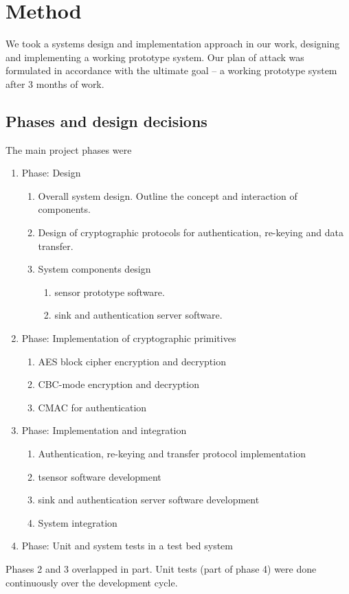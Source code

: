 \chapter{Method}

We took a systems design and implementation approach in our work, designing and implementing a working prototype system. Our plan of attack was formulated in accordance with the ultimate goal -- a working prototype system after 3 months of work. 

\section{Phases and design decisions}

The main project phases were
%
\begin{enumerate}

\item Phase: Design
\begin{enumerate}
\item Overall system design. Outline the concept and interaction of components.
\item Design of cryptographic protocols for authentication, re-keying and data transfer.
\item System components design
\begin{enumerate}
\item sensor prototype software.
\item sink and authentication server software.
\end{enumerate}
\end{enumerate}

\item Phase: Implementation of cryptographic primitives
\begin{enumerate}
\item AES block cipher encryption and decryption
\item CBC-mode encryption and decryption
\item CMAC for authentication
\end{enumerate}

\item Phase: Implementation and integration
\begin{enumerate}
\item Authentication, re-keying and transfer protocol implementation
\item tsensor software development
\item sink and authentication server software development
\item System integration
\end{enumerate}

\item Phase: Unit and system tests in a test bed system

\end{enumerate}
%
Phases 2 and 3 overlapped in part. Unit tests (part of phase 4) were done continuously over the development cycle.


